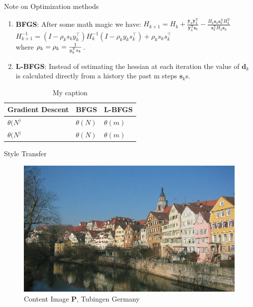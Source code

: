 \documentclass{beamer}
\begin{document}
\begin{frame}[allowframebreaks]{Note on Optimization methods}
\begin{enumerate}
        \item \textbf{BFGS}: After some math magic we have:
            $H_{k+1}=H_{k}+{\frac {\mathbf {y} _{k}\mathbf {y} _{k}
            ^{\mathrm {T} }}{\mathbf {y} _{k}^{\mathrm {T} }
            \mathbf {s} _{k}}}-{\frac {H_{k}\mathbf {s} _{k}\mathbf {s} _{k}^
            {\mathrm {T} }H_{k}^{\mathrm {T} }}{\mathbf {s} _{k}^
            {\mathrm {T} }H_{k}\mathbf {s} _{k}}}$\\
            $H^{-1}_{k+1}=(I-\rho _{k}s_{k}y_{k}^{\top })
            H^{-1}_{k}(I-\rho _{k}y_{k}s_{k}^{\top })+\rho _{k}s_{k}s_{k}^{\top }$\\
            where $\rho_k = \rho_k = \frac{1}{y^{\rm T}_k s_k} $.
        \item \textbf{L-BFGS}: Instead of estimating the hessian at each iteration
            the value of $\mathbf{d}_k$ is calculated directly from a history
            the past m steps $\mathbf{s}_k$s.
    \end{enumerate}
    \begin{table}[]
        \centering
        \caption{My caption}
        \label{my-label}
        \begin{tabular}{l|l|l}
            Gradient Descent              & BFGS        & L-BFGS      \\ \hline
            $\theta(N^)$ & $\theta(N)$ & $\theta(m)$ \\
            $\theta(N^)$ & $\theta(N)$ & $\theta(m)$
        \end{tabular}
    \end{table}
\end{frame}
\begin{frame}{Style Transfer}
\begin{figure}[H]
\centering
\includegraphics[width=.8\textwidth]{img/content/tubingen}
\caption*{Content Image \textbf{P}, Tubingen Germany}
\end{figure}
\end{frame}
\end{document}

